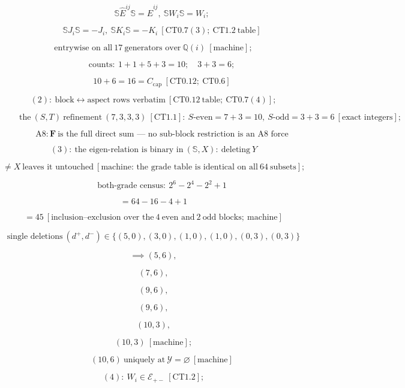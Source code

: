\begin{theorem}
\[
\qquad \mathbb S\hat E^{ij}\mathbb S=\hat E^{ij},\ \mathbb SW_i\mathbb S=W_i;
\]

\[
\qquad \mathbb SJ_i\mathbb S=-J_i,\ \mathbb SK_i\mathbb S=-K_i\ [\mathrm{CT0.7}(3);\ \mathrm{CT1.2}\ \text{table}]
\]

\[
\text{entrywise on all}\ 17\ \text{generators over}\ \mathbb Q(i)\ [\text{machine}];
\]

\[
\qquad \text{counts}:\ 1+1+5+3=10;\quad3+3=6;
\]

\[
\qquad 10+6=16=C_{\mathrm{cap}}\ [\mathrm{CT0.12};\ \mathrm{CT0.6}]
\]

\[
(2):\ \text{block}\leftrightarrow\text{aspect rows verbatim}\ [\mathrm{CT0.12}\ \text{table};\ \mathrm{CT0.7}(4)];
\]

\[
\qquad \text{the}\ (S,T)\ \text{refinement}\ (7,3,3,3)\ [\mathrm{CT1.1}]:\ S\text{-even}=7+3=10,\ S\text{-odd}=3+3=6\ [\text{exact integers}];
\]

\[
\qquad \text{A8}: \mathbf F\ \text{is the full direct sum — no sub-block restriction is an A8 force}
\]

\[
(3):\ \text{the eigen-relation is binary in}\ (\mathbb S,X):\ \text{deleting}\ Y
\]

\[
\ne X\ \text{leaves it untouched}\ [\text{machine: the grade table is identical on all}\ 64\ \text{subsets}];
\]

\[
\qquad \text{both-grade census}:\ 2^6-2^4-2^2+1
\]

\[
= 64-16-4+1
\]

\[
= 45\ [\text{inclusion–exclusion over the}\ 4\ \text{even and}\ 2\ \text{odd blocks};\ \text{machine}]
\]

\[
\text{single deletions}\ (d^+,d^-)\in\{(5,0),(3,0),(1,0),(1,0),(0,3),(0,3)\}
\]

\[
\implies (5,6),
\]

\[
(7,6),
\]

\[
(9,6),
\]

\[
(9,6),
\]

\[
(10,3),
\]

\[
(10,3)\ [\text{machine}];
\]

\[
\qquad (10,6)\ \text{uniquely at}\ \mathcal Y=\varnothing\ [\text{machine}]
\]

\[
(4):\ W_i\in\mathcal E_{+-}\ [\mathrm{CT1.2}];
\]


\end{theorem}
